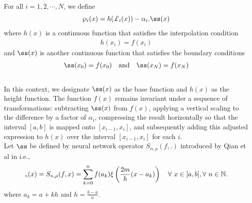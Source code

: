 \documentclass{article}[12pt, a4]
\begin{document}
	For all $i=1,2,\cdots,N$, we define 
	\begin{equation}\label{qi}
		\wp_{i}(x)=h(\pounds_i(x))-\alpha_{i}.\ss(x)  
	\end{equation}
	where $h(x)$ is a continuous function that satisfies the interpolation condition
	\begin{align}\label{hi}
		h(x_i)=f(x_i)
	\end{align}
	and $\ss(x)$ is another continuous function that satisfies the boundary conditions
	\begin{align}\label{b1}
		\ss(x_0)=f(x_0) \quad\text{and}\quad \ss(x_N)=f(x_N)
	\end{align}\\
	In this context, we designate $\ss(x)$ as the base function and $h(x)$ as the height function. The function $f(x)$ remains invariant under a sequence of transformations: subtracting $\ss(x)$ from $f(x)$, applying a vertical scaling to the difference by a factor of $\alpha_i$, compressing the result horizontally so that the interval $[a, b]$ is mapped onto $[x_{i-1}, x_i]$, and subsequently adding this adjusted expression to $h(x)$ over the interval $[x_{i-1}, x_i]$ for each $i$.\\
	
	Let $\ss$ be defined by neural network operator $S_{n,\rho}(f, .)$ introduced by Qian et al in \cite{QIAN2022126781} i.e.,
	\begin{align}
		\ss(x)=S_{n,\rho}(f, x)= \sum_{k=0}^{n}f(a_k)\xi\left(\frac{2m}{h}(x-a_k)\right)\quad \forall~ x \in [a,b], \forall ~n \in \mathbb{N} .
	\end{align}
	where $a_k=a+kh$ and $h=\frac{b-a}{n}$.\\
	
\end{document}
